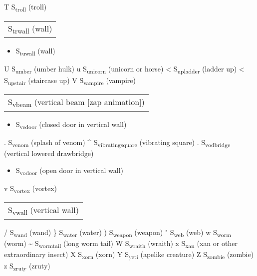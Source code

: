 \documentclass[11pt]{article}
\begin{document}
T S\textsubscript{troll}        (troll)
\begin{center}
\begin{tabular}{l}
S\textsubscript{trwall}        (wall)\\
\end{tabular}
\end{center}
\begin{itemize}
\item S\textsubscript{tuwall}        (wall)
\end{itemize}
U S\textsubscript{umber}        (umber hulk)
u S\textsubscript{unicorn}       (unicorn or horse)
< S\textsubscript{upladder}       (ladder up)
< S\textsubscript{upstair}       (staircase up)
V S\textsubscript{vampire}       (vampire)
\begin{center}
\begin{tabular}{l}
S\textsubscript{vbeam}        (vertical beam [zap animation])\\
\end{tabular}
\end{center}

\begin{itemize}
\item S\textsubscript{vcdoor}        (closed door in vertical wall)
\end{itemize}
. S\textsubscript{venom}        (splash of venom)
\^{} S\textsubscript{vibrating}\textsubscript{square}   (vibrating square)
. S\textsubscript{vodbridge}      (vertical lowered drawbridge)
\begin{itemize}
\item S\textsubscript{vodoor}        (open door in vertical wall)
\end{itemize}
v S\textsubscript{vortex}        (vortex)
\begin{center}
\begin{tabular}{l}
S\textsubscript{vwall}        (vertical wall)\\
\end{tabular}
\end{center}
/ S\textsubscript{wand}         (wand)
\} S\textsubscript{water}        (water)
) S\textsubscript{weapon}        (weapon)
" S\textsubscript{web}         (web)
w S\textsubscript{worm}         (worm)
\textasciitilde{} S\textsubscript{worm}\textsubscript{tail}      (long worm tail)
W S\textsubscript{wraith}        (wraith)
x S\textsubscript{xan}         (xan or other extraordinary insect)
X S\textsubscript{xorn}         (xorn)
Y S\textsubscript{yeti}         (apelike creature)
Z S\textsubscript{zombie}        (zombie)
z S\textsubscript{zruty}        (zruty)
\end{document}
